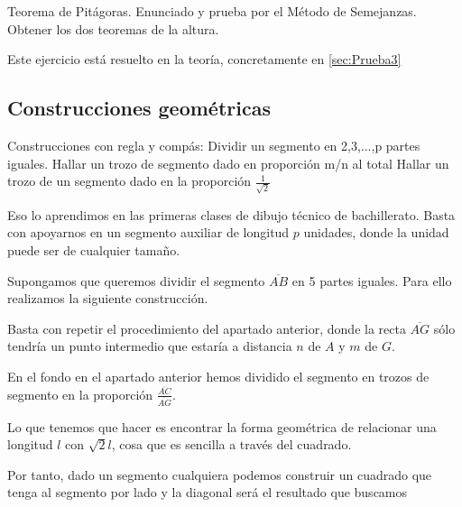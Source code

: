 \begin{problem}[16]
Teorema de Pitágoras. Enunciado y prueba por el Método de Semejanzas. Obtener los dos teoremas de la altura.

\solution

Este ejercicio está resuelto en la teoría, concretamente en \ref{sec:Prueba3}


\end{problem}


\subsection{Construcciones geométricas}
\begin{problem}[17]
\ppart Construcciones con regla y compás: Dividir un segmento en 2,3,...,p partes iguales.
\ppart Hallar un trozo de segmento dado en proporción m/n al total
\ppart Hallar un trozo de un segmento dado en la proporción $\frac{1}{\sqrt{2}}$

\solution
{}

\spart

Eso lo aprendimos en las primeras clases de dibujo técnico de bachillerato. Basta con apoyarnos en un segmento auxiliar de longitud $p$ unidades, donde la unidad puede ser de cualquier tamaño.

Supongamos que queremos dividir el segmento $\overline{AB}$ en 5 partes iguales. Para ello realizamos la siguiente construcción.

\begin{center}
\end{center}

\spart

Basta con repetir el procedimiento del apartado anterior, donde la recta $\overline{AG}$ sólo tendría un punto intermedio que estaría a distancia $n$ de $A$ y $m$ de $G$.

En el fondo en el apartado anterior hemos dividido el segmento en trozos de segmento en la proporción $\frac{\overline{AC}}{\overline{AG}}$.


\spart

Lo que tenemos que hacer es encontrar la forma geométrica de relacionar una longitud $l$ con $\sqrt{2}l$, cosa que es sencilla a través del cuadrado.

Por tanto, dado un segmento cualquiera podemos construir un cuadrado que tenga al segmento por lado y la diagonal será el resultado que buscamos


\end{problem}

